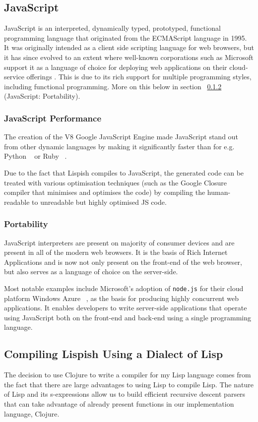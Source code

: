 \subsection{JavaScript}
JavaScript is an interpreted, dynamically typed, prototyped, functional programming language that originated from the ECMAScript language in 1995. It was originally intended as a client side scripting language for web browsers, but it has since evolved to an extent where well-known corporations such as Microsoft support it as a language of choice for deploying web applications on their cloud-service offerings \cite{nodejs.WindowsAzure}. This is due to its rich support for multiple programming styles, including functional programming. More on this below in section ~\ref{portability} (JavaScript: Portability).  

\subsubsection{JavaScript Performance}
The creation of the V8 Google JavaScript Engine made JavaScript stand out from other dynamic languages by making it significantly faster than for e.g. Python ~\cite{JavaScriptVSPython3} or Ruby ~\cite{JavaScriptVSRuby}.

Due to the fact that Lispish compiles to JavaScript, the generated code can be treated with various optimisation techniques (such as the Google Closure compiler that minimises and optimises the code) by compiling the human-readable to unreadable but highly optimised JS code.

\subsubsection{Portability}\label{portability}
JavaScript interpreters are present on majority of consumer devices and are present in all of the modern web browsers. It is the basis of Rich Internet Applications and is now not only present on the front-end of the web browser, but also serves as a language of choice on the server-side.

Most notable examples include Microsoft's adoption of \texttt{node.js} for their cloud platform Windows Azure ~\cite{nodejs.WindowsAzure}, as the basis for producing highly concurrent web applications. It enables developers to write server-side applications that operate using JavaScript both on the front-end and back-end using a single programming language.

\subsection{Compiling Lispish Using a Dialect of Lisp}
The decision to use Clojure to write a compiler for my Lisp language comes from the fact that there are large advantages to using Lisp to compile Lisp.
The nature of Lisp and its s-expressions allow us to build efficient recursive descent parsers that can take advantage of already present functions in our implementation language, Clojure.

